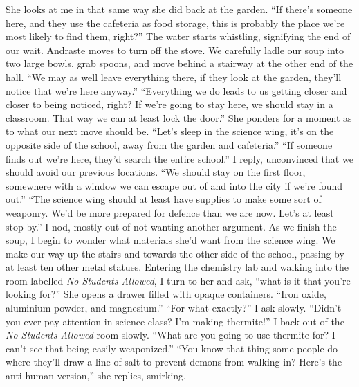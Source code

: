 \documentclass[a4paper, 12pt]{book}
\newcommand\tab[1][1cm]{\hspace*{#1}}
\begin{document}
\newline
\tab
She looks at me in that same way she did back at the garden. “If there’s someone here, and they use the cafeteria as food storage, this is probably the place we’re most likely to find them, right?” The water starts whistling, signifying the end of our wait. Andraste moves to turn off the stove. We carefully ladle our soup into two large bowls, grab spoons, and move behind a stairway at the other end of the hall. “We may as well leave everything there, if they look at the garden, they’ll notice that we’re here anyway.”
\newline
\tab
“Everything we do leads to us getting closer and closer to being noticed, right? If we’re going to stay here, we should stay in a classroom. That way we can at least lock the door.”
\newline
\tab
She ponders for a moment as to what our next move should be. “Let’s sleep in the science wing, it’s on the opposite side of the school, away from the garden and cafeteria.”
\newline
\tab
“If someone finds out we’re here, they’d search the entire school.” I reply, unconvinced that we should avoid our previous locations. “We should stay on the first floor, somewhere with a window we can escape out of and into the city if we’re found out.”
\newline
\tab
“The science wing should at least have supplies to make some sort of weaponry. We’d be more prepared for defence than we are now. Let’s at least stop by.” I nod, mostly out of not wanting another argument. As we finish the soup, I begin to wonder what materials she’d want from the science wing. We make our way up the stairs and towards the other side of the school, passing by at least ten other metal statues. Entering the chemistry lab and walking into the room labelled \textit{No Students Allowed}, I turn to her and ask, “what is it that you’re looking for?”
\newline
\tab
She opens a drawer filled with opaque containers. “Iron oxide, aluminium powder, and magnesium.” 
\newline
\tab
“For what exactly?” I ask slowly.
\newline
\tab
“Didn’t you ever pay attention in science class? I’m making thermite!”
\newline
\tab
I back out of the \textit{No Students Allowed} room slowly. “What are you going to use thermite for? I can’t see that being easily weaponized.”
\newline
\tab
“You know that thing some people do where they’ll draw a line of salt to prevent demons from walking in? Here’s the anti-human version,” she replies, smirking.
\end{document}
